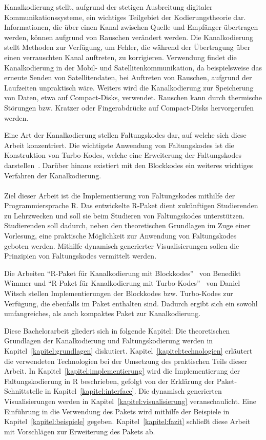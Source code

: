 Kanalkodierung stellt, aufgrund der stetigen Ausbreitung digitaler Kommunikationssysteme, ein wichtiges Teilgebiet der Kodierungstheorie dar. Informationen, die über einen Kanal zwischen Quelle und Empfänger übertragen werden, können aufgrund von Rauschen verändert werden. Die Kanalkodierung stellt Methoden zur Verfügung, um Fehler, die während der Übertragung über einen verrauschten Kanal auftreten, zu korrigieren. Verwendung findet die Kanalkodierung in der Mobil- und Satellitenkommunikation, da beispielsweise das erneute Senden von Satellitendaten, bei Auftreten von Rauschen, aufgrund der Laufzeiten unpraktisch wäre. Weiters wird die Kanalkodierung zur Speicherung von Daten, etwa auf Compact-Disks, verwendet. Rauschen kann durch thermische Störungen bzw. Kratzer oder Fingerabdrücke auf Compact-Disks hervorgerufen werden.

Eine Art der Kanalkodierung stellen Faltungskodes dar, auf welche sich diese Arbeit konzentriert. Die wichtigste Anwendung von Faltungskodes ist die Konstruktion von Turbo-Kodes, welche eine Erweiterung der Faltungskodes darstellen~\cite{huffman2010fundamentals}. Darüber hinaus existiert mit den Blockkodes ein weiteres wichtiges Verfahren der Kanalkodierung.
\\
\\
Ziel dieser Arbeit ist die Implementierung von Faltungskodes mithilfe der Programmiersprache R. Das entwickelte R-Paket dient zukünftigen Studierenden zu Lehrzwecken und soll sie beim Studieren von Faltungskodes unterstützen. Studierenden soll dadurch, neben den theoretischen Grundlagen im Zuge einer Vorlesung, eine praktische Möglichkeit zur Anwendung von Faltungskodes geboten werden. Mithilfe dynamisch generierter Visualisierungen sollen die Prinzipien von Faltungskodes vermittelt werden.

Die Arbeiten \enquote{R-Paket für Kanalkodierung mit Blockkodes}~\cite{wimmer} von Benedikt Wimmer und \enquote{R-Paket für Kanalkodierung mit Turbo-Kodes}~\cite{witsch} von Daniel Witsch stellen Implementierungen der Blockkodes bzw. Turbo-Kodes zur Verfügung, die ebenfalls im Paket enthalten sind. Dadurch ergibt sich ein sowohl umfangreiches, als auch kompaktes Paket zur Kanalkodierung.

Diese Bachelorarbeit gliedert sich in folgende Kapitel: Die theoretischen Grundlagen der Kanalkodierung und Faltungskodierung werden in Kapitel~\ref{kapitel:grundlagen} diskutiert. Kapitel~\ref{kapitel:technologien} erläutert die verwendeten Technologien bei der Umsetzung des praktischen Teils dieser Arbeit. In Kapitel~\ref{kapitel:implementierung} wird die Implementierung der Faltungskodierung in R beschrieben, gefolgt von der Erklärung der Paket-Schnittstelle in Kapitel~\ref{kapitel:interface}. Die dynamisch generierten Visualisierungen werden in Kapitel~\ref{kapitel:visualisierung} veranschaulicht. Eine Einführung in die Verwendung des Pakets wird mithilfe der Beispiele in Kapitel~\ref{kapitel:beispiele} gegeben. Kapitel~\ref{kapitel:fazit} schließt diese Arbeit mit Vorschlägen zur Erweiterung des Pakets ab.